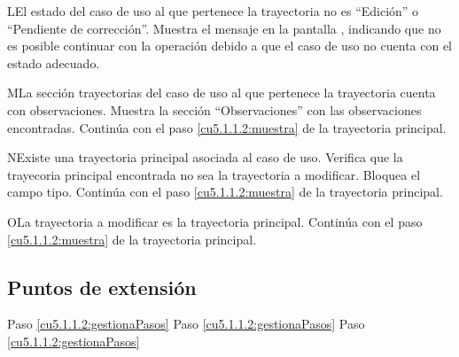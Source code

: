  \begin{UCtrayectoriaA}{L}{El estado del caso de uso al que pertenece la trayectoria no es ``Edición'' o ``Pendiente de corrección''.}
    \UCpaso[\UCsist] Muestra el mensaje  en la pantalla , indicando que no es posible
	continuar con la operación debido a que el caso de uso no cuenta con el estado adecuado.
 \end{UCtrayectoriaA}
 \begin{UCtrayectoriaA}{M}{La sección trayectorias del caso de uso al que pertenece la trayectoria cuenta con observaciones.}
    \UCpaso[\UCsist] Muestra la sección ``Observaciones'' con las observaciones encontradas.
	\UCpaso[] Continúa con el paso \ref{cu5.1.1.2:muestra} de la trayectoria principal.
 \end{UCtrayectoriaA}
 \begin{UCtrayectoriaA}{N}{Existe una trayectoria principal asociada al caso de uso.}
    \UCpaso[\UCsist] Verifica que la trayecoria principal encontrada no sea la trayectoria a modificar. 
	\UCpaso[\UCsist] Bloquea el campo tipo.	
	\UCpaso[] Continúa con el paso \ref{cu5.1.1.2:muestra} de la trayectoria principal.
 \end{UCtrayectoriaA}
 \begin{UCtrayectoriaA}{O}{La trayectoria a modificar es la trayectoria principal.}
	\UCpaso[] Continúa con el paso \ref{cu5.1.1.2:muestra} de la trayectoria principal.
 \end{UCtrayectoriaA}

\subsection{Puntos de extensión}

	{Paso \ref{cu5.1.1.2:gestionaPasos}}
	{}
	{Paso \ref{cu5.1.1.2:gestionaPasos}}
	{}	
	{Paso \ref{cu5.1.1.2:gestionaPasos}}
	{}
  